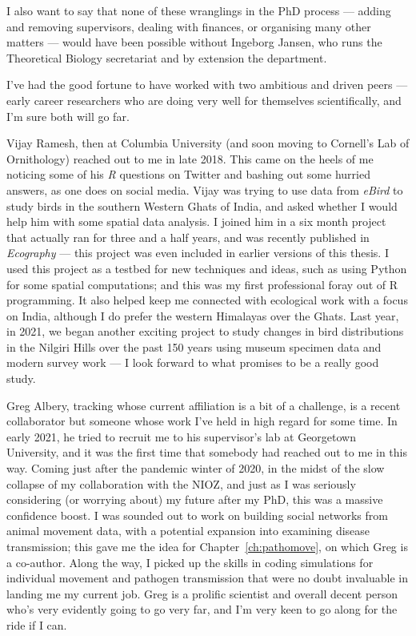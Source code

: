 I also want to say that none of these wranglings in the PhD process --- adding and removing supervisors, dealing with finances, or organising many other matters --- would have been possible without Ingeborg Jansen, who runs the Theoretical Biology secretariat and by extension the department.

\medskip

I've had the good fortune to have worked with two ambitious and driven peers --- early career researchers who are doing very well for themselves scientifically, and I'm sure both will go far.

\noindent Vijay Ramesh, then at Columbia University (and soon moving to Cornell's Lab of Ornithology) reached out to me in late 2018.
This came on the heels of me noticing some of his \textit{R} questions on Twitter and bashing out some hurried answers, as one does on social media.
Vijay was trying to use data from \textit{eBird} to study birds in the southern Western Ghats of India, and asked whether I would help him with some spatial data analysis.
I joined him in a six month project that actually ran for three and a half years, and was recently published in \textit{Ecography} --- this project was even included in earlier versions of this thesis.
I used this project as a testbed for new techniques and ideas, such as using Python for some spatial computations; and this was my first professional foray out of R programming.
It also helped keep me connected with ecological work with a focus on India, although I do prefer the western Himalayas over the Ghats.
Last year, in 2021, we began another exciting project to study changes in bird distributions in the Nilgiri Hills over the past 150 years using museum specimen data and modern survey work --- I look forward to what promises to be a really good study.

\noindent Greg Albery, tracking whose current affiliation is a bit of a challenge, is a recent collaborator but someone whose work I've held in high regard for some time.
In early 2021, he tried to recruit me to his supervisor's lab at Georgetown University, and it was the first time that somebody had reached out to me in this way. 
Coming just after the pandemic winter of 2020, in the midst of the slow collapse of my collaboration with the NIOZ, and just as I was seriously considering (or worrying about) my future after my PhD, this was a massive confidence boost.
I was sounded out to work on building social networks from animal movement data, with a potential expansion into examining disease transmission; this gave me the idea for Chapter~\ref{ch:pathomove}, on which Greg is a co-author.
Along the way, I picked up the skills in coding simulations for individual movement and pathogen transmission that were no doubt invaluable in landing me my current job.
Greg is a prolific scientist and overall decent person who's very evidently going to go very far, and I'm very keen to go along for the ride if I can.

